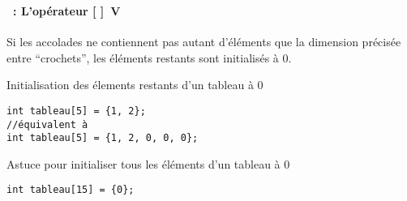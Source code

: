 \begin{frame}[containsverbatim]
  \frametitle{\secname}
  \framesubtitle{\subsecname~: L'opérateur [ ]~V}

  Si les accolades ne contiennent pas autant d'éléments que la dimension précisée entre ``crochets'', les éléments restants sont
  initialisés à 0.
  \vspace{0.5cm}
  \begin{exampleblock}{Initialisation des élements restants d'un tableau à 0}
    \begin{verbatim}
int tableau[5] = {1, 2};
//équivalent à 
int tableau[5] = {1, 2, 0, 0, 0};\end{verbatim}
  \end{exampleblock}
  \vspace{0.5cm}
  \begin{exampleblock}{Astuce pour initialiser tous les éléments d'un tableau à 0}
    \begin{verbatim}
int tableau[15] = {0};\end{verbatim}
  \end{exampleblock}
\end{frame}

